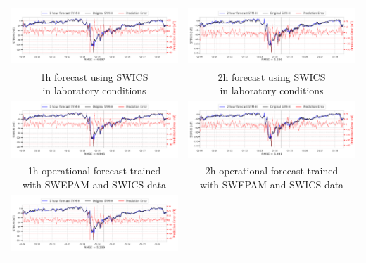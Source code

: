 \documentclass[draft,sw]{agutexSI2019}
\begin{document}
\begin{table}
\centering
\begin{tabular}{cc}
\includegraphics[width=0.49\linewidth]{paper_plots_shade/1h_swics/1h_swics_storm_28.png}
&
\includegraphics[width=0.49\linewidth]{paper_plots_shade/2h_swics/2h_swics_storm_28.png}
\\
\shortstack{1h forecast using SWICS\\ in laboratory conditions} & \shortstack{2h forecast using SWICS\\ in laboratory conditions}
\vspace*{12pt}
\\
\includegraphics[width=0.49\linewidth]{paper_plots_shade/1h_swics_rt/1h_swics_rt_storm_28.png}
&
\includegraphics[width=0.49\linewidth]{paper_plots_shade/2h_swics_rt/2h_swics_rt_storm_28.png}
\\
\shortstack{1h operational forecast trained\\ with SWEPAM and SWICS data} & \shortstack{2h operational forecast trained\\ with SWEPAM and SWICS data}
\vspace*{12pt}
\\
\includegraphics[width=0.49\linewidth]{paper_plots_shade/1h_swepam_rt/1h_swepam_rt_storm_28.png}

\end{tabular}
\end{table}
\end{document}
